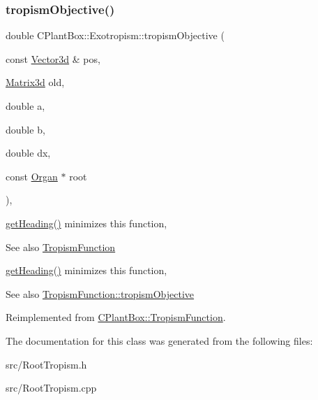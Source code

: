 \subsubsection{\texorpdfstring{tropism\+Objective()}{tropismObjective()}}
{\footnotesize\ttfamily double C\+Plant\+Box\+::\+Exotropism\+::tropism\+Objective (\begin{DoxyParamCaption}\item[{const \hyperlink{classCPlantBox_1_1Vector3d}{Vector3d} \&}]{pos,  }\item[{\hyperlink{classCPlantBox_1_1Matrix3d}{Matrix3d}}]{old,  }\item[{double}]{a,  }\item[{double}]{b,  }\item[{double}]{dx,  }\item[{const \hyperlink{classCPlantBox_1_1Organ}{Organ} $\ast$}]{root }\end{DoxyParamCaption})\hspace{0.3cm}{\ttfamily [override]}, {\ttfamily [virtual]}}



\hyperlink{classCPlantBox_1_1TropismFunction_adb52b88734a94fe1365a00e02c7e6be5}{get\+Heading()} minimizes this function, 

\begin{DoxySeeAlso}{See also}
\hyperlink{classCPlantBox_1_1TropismFunction}{Tropism\+Function}
\end{DoxySeeAlso}
\hyperlink{classCPlantBox_1_1TropismFunction_adb52b88734a94fe1365a00e02c7e6be5}{get\+Heading()} minimizes this function, \begin{DoxySeeAlso}{See also}
\hyperlink{classCPlantBox_1_1TropismFunction_a4f2c79fff55d1398c98a070dd8ebbe08}{Tropism\+Function\+::tropism\+Objective} 
\end{DoxySeeAlso}


Reimplemented from \hyperlink{classCPlantBox_1_1TropismFunction_a4f2c79fff55d1398c98a070dd8ebbe08}{C\+Plant\+Box\+::\+Tropism\+Function}.



The documentation for this class was generated from the following files\+:\begin{DoxyCompactItemize}
\item 
src/Root\+Tropism.\+h\item 
src/Root\+Tropism.\+cpp\end{DoxyCompactItemize}
